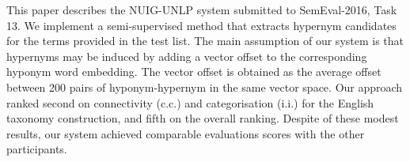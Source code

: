 This paper describes the NUIG-UNLP system submitted to SemEval-2016, Task 13. We implement a semi-supervised method that extracts hypernym candidates for the terms provided in the test list. The main assumption of our system is that hypernyms may be induced by adding a vector offset to the corresponding hyponym word embedding. The vector offset is obtained as the average offset between 200 pairs of hyponym-hypernym in the same vector space. Our approach ranked second on connectivity (c.c.) and categorisation (i.i.) for the English taxonomy construction, and fifth on the overall ranking. Despite of these modest results, our system achieved comparable evaluations scores with the other participants.
